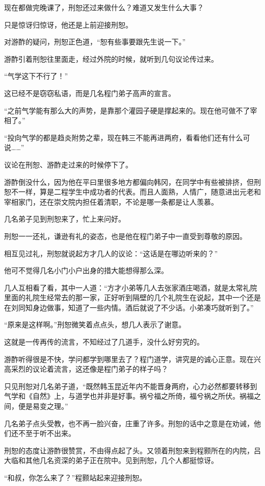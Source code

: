 现在都做完晚课了，刑恕还过来做什么？难道又发生什么大事？

只是惊讶归惊讶，他还是上前迎接刑恕。

对游酢的疑问，刑恕正色道，“恕有些事要跟先生说一下。”

游酢引着刑恕往里面走，经过外院的时候，就听到几句议论传过来。

“气学这下不行了！”

这已经不是窃窃私语，而是几名程门弟子高声的宣言。

“之前气学能有那么大的声势，是靠那个灌园子硬是撑起来的。现在他可做不了宰相了。”

“投向气学的都是趋炎附势之辈，现在韩三不能再进两府，看看他们还有什么可说……”

议论在刑恕、游酢走过来的时候停下了。

游酢倒没什么，因为他在平曰里很多地方都偏向韩冈，在同学中有些被排挤，但刑恕不一样，算是二程学生中成功者的代表。而且人面熟，人情广，随意进出元老和宰相家门，还在崇文院内担任着清职，不论是哪一条都是让人羡慕。

几名弟子见到刑恕来了，忙上来问好。

刑恕一一还礼，谦逊有礼的姿态，也是他在程门弟子中一直受到尊敬的原因。

相互见过礼，刑恕就说起方才几人的议论：“这话是在哪边听来的？”

他可不觉得几名小门小户出身的措大能想得那么深。

几人互相看了看，其中一人道：“方才小弟等几人去张家酒庄喝酒，就是太常礼院里面的礼院生经常去的那一家，正好听到隔壁的几个礼院生在说起，其中一个还是在刘同知身边做事，知道了一些内情。酒后就说了不少话。小弟凑巧就听到了。”

“原来是这样啊。”刑恕微笑着点点头，想几人表示了谢意。

这就是一传再传的流言，不知经过了几道手，没什么好穷究的。

游酢听得很是不快，学问都学到哪里去了？程门道学，讲究是的诚心正意。现在兴高采烈的议论着流言，这还像是程门弟子的样子吗？

只见刑恕对几名弟子道，“既然韩玉昆近年内不能晋身两府，心力必然都要转移到气学和《自然》上，与道学也并非是好事。祸兮福之所倚，福兮祸之所伏。祸福之间，便是易变之理。”

几名弟子点头受教，也不再一脸兴奋，庄重了许多。刑恕的话中之意是在劝诫，他们还不至于听不出来。

刑恕的态度让游酢很赞赏，不由得点起了头。又领着刑恕来到程颢所在的内院，吕大临和其他几名资深的弟子正在院中。见到刑恕，几个人都挺惊讶。

“和叔，你怎么来了？”程颢站起来迎接刑恕。

